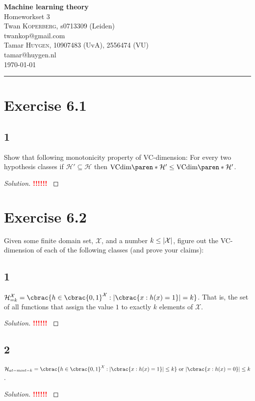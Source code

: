 \documentclass[10pt, a4paper, twoside]{amsart}
\makeatletter
\DeclarePairedDelimiter\abs{\lvert}{\rvert}
\DeclarePairedDelimiter\cbrac\{\}
\DeclarePairedDelimiter\paren()
\newcommand{\cH}{\ensuremath{\mathcal{H}}}
\newcommand{\cX}{\ensuremath{\mathcal{X}}}
\newenvironment{solution}
               {\let\oldqedsymbol=\qedsymbol
                \renewcommand{\qedsymbol}{$\blacktriangleleft$}
                \begin{proof}[Solution]}
               {\end{proof}
                \renewcommand{\qedsymbol}{\oldqedsymbol}}
\newcommand{\TODO}{\textcolor{red}{\textbf{!!!!!! }}}
\newcommand{\firstName}  {Twan}
\newcommand{\lastName}   {Koperberg}
\newcommand{\studId}     {0713309 (Leiden)}
\renewcommand{\email}    {twankop@gmail.com}
\newcommand{\firstNameII}  {Tamar}
\newcommand{\lastNameII}   {Huygen}
\newcommand{\studIdII}     {10907483 (UvA)}
\newcommand{\studIdIII}    {2556474 (VU)}
\newcommand{\emailII}     {tamar@huygen.nl}
\makeatother
\begin{document}
\begin{center}

  {\huge\bf Machine learning theory}\\
  {\large\sc Homeworkset 3 }\\ \vspace{1em}
  \firstName \textsc{ \lastName}, {\sc s}\studId \\
  \email\text{}\\ \smallskip
  \firstNameII \textsc{ \lastNameII}, \studIdII, \studIdIII\\
  \emailII \\ \bigskip
  \today \\\bigskip
  \hrule
  \bigskip
\end{center}

\section*{Exercise 6.1}
\subsection*{1}
Show that following monotonicity property of VC-dimension: For every two hypothesis classes if $\cH' \subseteq \cH$ then $\text{VCdim}\paren*{\cH'}\leq \text{VCdim}\paren*{\cH'}$.
\begin{solution}
 \TODO
\end{solution}
\section*{Exercise 6.2}
Given some finite domain set, $\cX$, and a number $k \leq \abs{\cX}$, figure out the VC-dimension of each of the following classes (and prove your claims):
\subsection*{1}
$\cH^{\cX}_{=k} = \cbrac{h \in \cbrac{0,1}^{\cX}: \abs{\cbrac{x: h(x) = 1}}=k}$. That is, the set of all functions that assign the value $1$ to exactly $k$ elements of $\cX$.
\begin{solution}
\TODO
\end{solution}
\subsection*{2}
$\cH_{at-most-k} = \cbrac{h \in \cbrac{0,1}^{\cX}: \abs{\cbrac{x: h(x) = 1}} \leq k} \text{ or }  \abs{\cbrac{x: h(x) = 0}}\leq k$.
\begin{solution}
\TODO
\end{solution}
\end{document}
